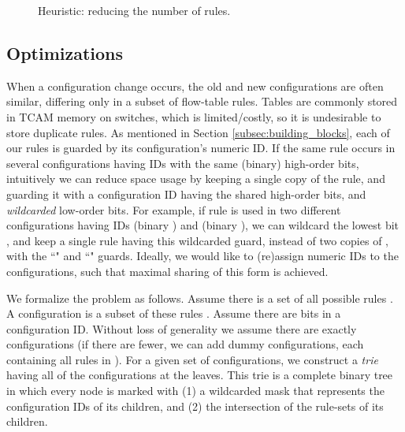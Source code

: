 \documentclass[pldi-cameraready]{sigplanconf}
\begin{document}
\begin{figure}[t]
\footnotesize
{}
\caption{Heuristic: reducing the number of rules.}
\label{fig:heuristic}
\end{figure}

\subsection{Optimizations}
\label{sec:opt}

When a configuration change occurs,
the old and new configurations are often similar, 
differing only in a subset of flow-table rules.
Tables are commonly stored in TCAM memory on switches, which is
limited/costly, so it is undesirable to store duplicate rules. 
As mentioned in Section \ref{subsec:building_blocks}, each
of our rules is guarded by its configuration's numeric ID.
If the same rule occurs in several configurations having
IDs with the same (binary) high-order bits,
intuitively we can reduce space
usage by keeping a single copy of the rule, and guarding it
with a configuration ID having the shared high-order bits, and {\em wildcarded} low-order bits.
For example, if rule  is used in two different 
configurations having IDs  (binary ) and  (binary ), 
we can wildcard the lowest bit , and keep a single rule  having this wildcarded
guard, instead of two copies of , with the ``" and ``" guards.
Ideally, we would like to (re)assign numeric IDs to the configurations, such
that maximal sharing of this form is achieved.


We formalize the problem as follows. 
Assume there is a set of all possible rules .
A configuration  is a subset of these rules .
Assume there are  bits in a configuration ID.
Without loss of generality we assume there are exactly  configurations 
(if there are fewer, we can add dummy configurations, each containing all rules in ). 
For a given set of configurations, we construct a \emph{trie} having all
of the configurations at the leaves.
This trie is a complete binary tree in which every node is marked 
with (1) a wildcarded mask that represents the configuration IDs of its children,
and (2) the intersection of the rule-sets of its children.
\end{document}

